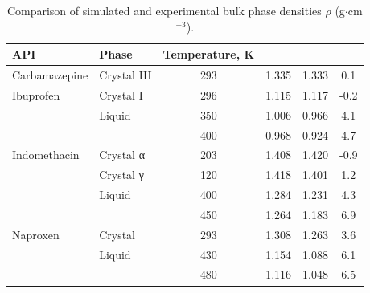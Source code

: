 	\begin{table}[h!]
		\centering
		\begin{tabular}{llcccc}
			\hline
			\textbf{API} & \textbf{Phase} & \textbf{Temperature, K} & \boldmath{$\rho_\textbf{MD}$} & \boldmath{$\rho_\textbf{exp}$} & \boldmath{$100(\rho_\textbf{MD}/\rho_\textbf{exp}^{−1})$} \\ \toprule
			Carbamazepine     & Crystal III    & 293                    & 1.335                                 & 1.333                                 & 0.1                                 \\ \midrule
			Ibuprofen         & Crystal I      & 296                    & 1.115                                 & 1.117                                 & -0.2                                \\ 
			& Liquid         & 350                    & 1.006                                 & 0.966                                 & 4.1                                 \\ 
			&                & 400                    & 0.968                                 & 0.924                                 & 4.7                                 \\ \midrule
			Indomethacin      & Crystal α      & 203                    & 1.408                                 & 1.420                                 & -0.9                                \\
			& Crystal γ      & 120                    & 1.418                                 & 1.401                                 & 1.2                                 \\ 
			& Liquid         & 400                    & 1.284                                 & 1.231                                 & 4.3                                 \\ 
			&                & 450                    & 1.264                                 & 1.183                                 & 6.9                                 \\ \midrule
			Naproxen          & Crystal        & 293                    & 1.308                                 & 1.263                                 & 3.6                                 \\ 
			& Liquid         & 430                    & 1.154                                 & 1.088                                 & 6.1                                 \\ 
			&                & 480                    & 1.116                                 & 1.048                                 & 6.5                                 \\ \bottomrule
		\end{tabular}
		\caption{Comparison of simulated and experimental bulk phase densities $\rho$ (g$\cdot$cm$^{-3}$).}
		\label{tab:densities}
		\vspace{-0.5cm}
	\end{table}


